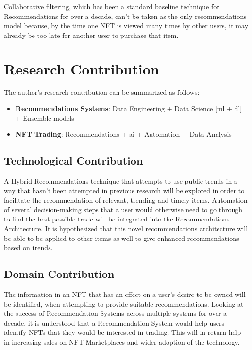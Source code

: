 Collaborative filtering, which has been a standard baseline technique for Recommendations for over a decade, can't be taken as the only recommendations model because, by the time one NFT is viewed many times by other users, it may already be too late for another user to purchase that item.


\section{Research Contribution}


The author's research contribution can be summarized as follows:
\begin{itemize}
\item \textbf{Recommendations Systems}: Data Engineering + Data Science [\Gls{ml} + \Gls{dl}] + Ensemble models
\item \textbf{NFT Trading}: Recommendations + \Gls{ai} + Automation + Data Analysis
\end{itemize}

\subsection{Technological Contribution}

A Hybrid Recommendations technique that attempts to use public trends in a way that hasn't been attempted in previous research will be explored in order to facilitate the recommendation of relevant, trending and timely items. Automation of several decision-making steps that a user would otherwise need to go through to find the best possible trade will be integrated into the Recommendations Architecture. It is hypothesized that this novel recommendations architecture will be able to be applied to other items as well to give enhanced recommendations based on trends.

\subsection{Domain Contribution}

The information in an NFT that has an effect on a user's desire to be owned will be identified, when attempting to provide suitable recommendations.
Looking at the success of Recommendation Systems across multiple systems for over a decade, it is understood that a Recommendation System would help users identify NFTs that they would be interested in trading. This will in return help in increasing sales on NFT Marketplaces and wider adoption of the technology.

